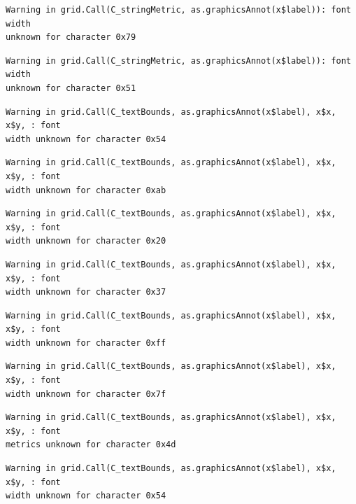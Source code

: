 \documentclass[
  letterpaper,
]{scrbook}
\begin{document}
\begin{verbatim}
Warning in grid.Call(C_stringMetric, as.graphicsAnnot(x$label)): font width
unknown for character 0x79
\end{verbatim}

\begin{verbatim}
Warning in grid.Call(C_stringMetric, as.graphicsAnnot(x$label)): font width
unknown for character 0x51
\end{verbatim}

\begin{verbatim}
Warning in grid.Call(C_textBounds, as.graphicsAnnot(x$label), x$x, x$y, : font
width unknown for character 0x54
\end{verbatim}

\begin{verbatim}
Warning in grid.Call(C_textBounds, as.graphicsAnnot(x$label), x$x, x$y, : font
width unknown for character 0xab
\end{verbatim}

\begin{verbatim}
Warning in grid.Call(C_textBounds, as.graphicsAnnot(x$label), x$x, x$y, : font
width unknown for character 0x20
\end{verbatim}

\begin{verbatim}
Warning in grid.Call(C_textBounds, as.graphicsAnnot(x$label), x$x, x$y, : font
width unknown for character 0x37
\end{verbatim}

\begin{verbatim}
Warning in grid.Call(C_textBounds, as.graphicsAnnot(x$label), x$x, x$y, : font
width unknown for character 0xff
\end{verbatim}

\begin{verbatim}
Warning in grid.Call(C_textBounds, as.graphicsAnnot(x$label), x$x, x$y, : font
width unknown for character 0x7f
\end{verbatim}

\begin{verbatim}
Warning in grid.Call(C_textBounds, as.graphicsAnnot(x$label), x$x, x$y, : font
metrics unknown for character 0x4d
\end{verbatim}

\begin{verbatim}
Warning in grid.Call(C_textBounds, as.graphicsAnnot(x$label), x$x, x$y, : font
width unknown for character 0x54
\end{verbatim}
\end{document}

